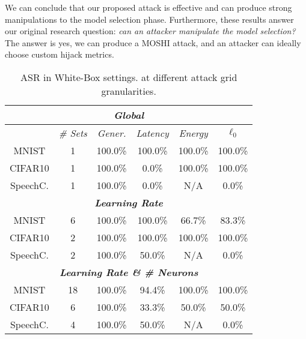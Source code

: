 \par
We can conclude that our proposed attack is effective and can produce strong manipulations to the model selection phase. 
Furthermore, these results answer our original research question: \textit{can an attacker manipulate the model selection?}
The answer is yes, we can produce a MOSHI attack, and an attacker can ideally choose custom hijack metrics.

\begin{table}[!htpb]
\centering
\footnotesize
\caption{ASR in White-Box settings. at different attack grid granularities.}
\begin{tabular}{c|c|c|c|c|c}  \toprule
\multicolumn{6}{c}{\textit{\textbf{Global}}} \\ \midrule
 & \textit{\# Sets} &\textit{Gener.} & \textit{Latency} & \textit{Energy} & \textit{$\ell_0$} \\ \midrule
MNIST & 1 & 100.0\% & 100.0\% & 100.0\% & 100.0\% \\
CIFAR10 & 1 &100.0\% & 0.0\% & 100.0\% & 100.0\% \\
SpeechC. & 1 & 100.0\% & 0.0\% & N/A & 0.0\% \\ \midrule
\multicolumn{6}{c}{\textit{\textbf{Learning Rate}}} \\ \midrule
MNIST & 6 &  100.0\% & 100.0\% & 66.7\% & 83.3\% \\
CIFAR10 & 2 & 100.0\% & 100.0\% & 100.0\% & 100.0\% \\
SpeechC. & 2 & 100.0\% & 50.0\% & N/A & 0.0\% \\\midrule
\multicolumn{6}{c}{\textit{\textbf{Learning Rate \& \# Neurons}}} \\ \midrule
MNIST & 18 & 100.0\% & 94.4\% & 100.0\% & 100.0\% \\
CIFAR10 & 6 & 100.0\% & 33.3\% & 50.0\% & 50.0\% \\
SpeechC. & 4 & 100.0\% & 50.0\% & N/A & 0.0\% \\ \bottomrule
\end{tabular}
\label{tab.asr-wb}
\end{table}

